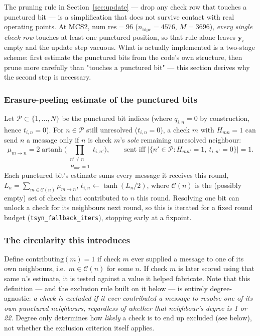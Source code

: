 \documentclass{article}
\begin{document}
The pruning rule in Section~\ref{sec:update} — drop any check row that touches a punctured bit — is a
simplification that does not survive contact with real operating points. At MCS2,
$\text{num\_res}=96$ ($n_{\text{ldpc}}=4576$, $M=3696$), \emph{every single check row}
touches at least one punctured position, so that rule alone leaves $\mathbf{y}_i$ empty and
the update step vacuous. What is actually implemented is a two-stage scheme: first estimate
the punctured bits from the code's own structure, then prune more carefully than "touches a
punctured bit" — this section derives why the second step is necessary.

\subsubsection*{Erasure-peeling estimate of the punctured bits}

Let $\mathcal{P} \subset \{1,\dots,N\}$ be the punctured bit indices (where $q_{i,n}=0$ by
construction, hence $t_{i,n}=0$). For $n \in \mathcal{P}$ still unresolved ($t_{i,n}=0$), a
check $m$ with $H_{mn}=1$ can send $n$ a message only if $n$ is check $m$'s \emph{sole}
remaining unresolved neighbour:
\begin{equation}
\mu_{m \to n} = 2\operatorname{artanh}\!\Big(\prod_{\substack{n' \ne n \\ H_{mn'}=1}} t_{i,n'}\Big),
\qquad\text{sent iff } \big|\{n' \in \mathcal{P} : H_{mn'}=1,\ t_{i,n'}=0\}\big| = 1 .
\end{equation}
Each punctured bit's estimate sums every message it receives this round,
$L_n = \sum_{m \in \mathcal{C}(n)} \mu_{m\to n}$, $t_{i,n} \leftarrow \tanh(L_n/2)$, where
$\mathcal{C}(n)$ is the (possibly empty) set of checks that contributed to $n$ this round.
Resolving one bit can unlock a check for its neighbours next round, so this is iterated for a
fixed round budget (\texttt{tsyn\_fallback\_iters}), stopping early at a fixpoint.

\subsubsection*{The circularity this introduces}

Define $\text{contributing}(m) = 1$ if check $m$ ever supplied a message to one of its own
neighbours, i.e.\ $m \in \mathcal{C}(n)$ for some $n$. If check $m$ is later scored using that
same $n$'s estimate, it is tested against a value it helped fabricate. Note that this
definition — and the exclusion rule built on it below — is entirely degree-agnostic: \emph{a
check is excluded if it ever contributed a message to resolve one of its own punctured
neighbours, regardless of whether that neighbour's degree is 1 or 22.} Degree only determines
how \emph{likely} a check is to end up excluded (see below), not whether the exclusion
criterion itself applies.
\end{document}
